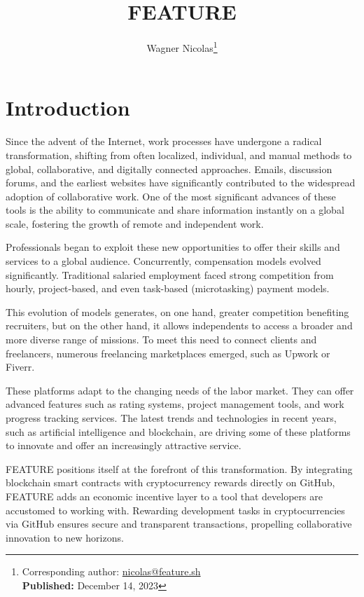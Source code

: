 \documentclass[
	a4paper, %
	10pt, %
	unnumberedsections, %
	twoside, %
]{LTJournalArticle}
\title{FEATURE} %
\author{%
	Wagner Nicolas\thanks{Corresponding author: \href{mailto:nicolas@feature.sh}{nicolas@feature.sh}\\ \textbf{Published:} December 14, 2023}
}
\begin{document}
\maketitle %


\section{Introduction}

Since the advent of the Internet, work processes have undergone a radical transformation, shifting from often localized, individual, and manual methods to global, collaborative, and digitally connected approaches. Emails, discussion forums, and the earliest websites have significantly contributed to the widespread adoption of collaborative work. One of the most significant advances of these tools is the ability to communicate and share information instantly on a global scale, fostering the growth of remote and independent work.

Professionals began to exploit these new opportunities to offer their skills and services to a global audience. Concurrently, compensation models evolved significantly. Traditional salaried employment faced strong competition from hourly, project-based, and even task-based (microtasking) payment models.

This evolution of models generates, on one hand, greater competition benefiting recruiters, but on the other hand, it allows independents to access a broader and more diverse range of missions. To meet this need to connect clients and freelancers, numerous freelancing marketplaces emerged, such as Upwork or Fiverr.

These platforms adapt to the changing needs of the labor market. They can offer advanced features such as rating systems, project management tools, and work progress tracking services. The latest trends and technologies in recent years, such as artificial intelligence and blockchain, are driving some of these platforms to innovate and offer an increasingly attractive service.

FEATURE positions itself at the forefront of this transformation. By integrating blockchain smart contracts with cryptocurrency rewards directly on GitHub, FEATURE adds an economic incentive layer to a tool that developers are accustomed to working with. Rewarding development tasks in cryptocurrencies via GitHub ensures secure and transparent transactions, propelling collaborative innovation to new horizons.
\end{document}
